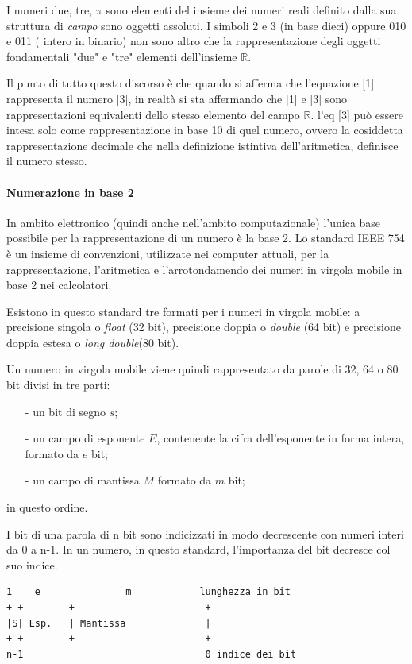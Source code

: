 \documentclass{article}
\begin{document}
I numeri due, tre, $\pi$ sono elementi del insieme dei numeri reali definito dalla sua struttura di \emph{campo} sono oggetti assoluti.
I simboli 2 e 3 (in base dieci) oppure 010 e 011 ( intero in binario) non sono altro che la rappresentazione degli oggetti fondamentali "due" e "tre" elementi dell'insieme $\mathbb{R}$. 

Il punto di tutto questo discorso è che quando si afferma che l'equazione [1] rappresenta il numero [3], in realtà si sta affermando che [1] e [3] sono rappresentazioni equivalenti dello stesso elemento del campo $\mathbb{R}$.
l'eq [3] può essere intesa solo come rappresentazione in base 10 di quel numero, ovvero la cosiddetta rappresentazione decimale che nella definizione istintiva dell'aritmetica, definisce il numero stesso.

\paragraph{Numerazione in base 2}

In ambito elettronico (quindi anche nell'ambito computazionale) l'unica base possibile per la rappresentazione di un numero è la base 2.
Lo standard IEEE 754 è un insieme di convenzioni, utilizzate nei computer attuali, per la rappresentazione, l'aritmetica e l'arrotondamendo dei numeri in virgola mobile in base 2 nei calcolatori.

Esistono in questo standard tre formati per i numeri in virgola mobile: a precisione singola o \emph{float} (32 bit), precisione doppia o \emph{double} (64 bit) e precisione doppia estesa o \emph{long double}(80 bit).

Un numero in virgola mobile viene quindi rappresentato da parole di 32, 64 o 80 bit divisi in tre
parti:
\begin{itemize}
	\item[-]	un bit di segno $s$;
	\item[-]	un campo di esponente $E$, contenente la cifra dell'esponente in forma intera, formato da $e$ bit;
	\item[-]	un campo di mantissa $M$ formato da $m$ bit;
\end{itemize}
in questo ordine. 

I bit di una parola di n bit sono indicizzati in modo decrescente con numeri interi da 0 a n-1. In un numero, in questo standard, l'importanza del bit decresce col suo indice.

\begin{lstlisting}[frame=single]
 1    e               m            lunghezza in bit
+-+--------+-----------------------+
|S| Esp.   | Mantissa              |
+-+--------+-----------------------+
n-1                                0 indice dei bit
\end{lstlisting}
\end{document}
